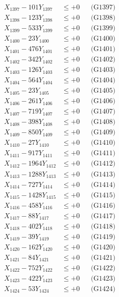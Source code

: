 \documentclass[a4paper,10pt]{article}
\begin{document}
{\begin{align}
X_{1397} - 101Y_{1397} &\leq +0 && \text{(G1397)} \\
X_{1398} - 123Y_{1398} &\leq +0 && \text{(G1398)} \\
X_{1399} - 533Y_{1399} &\leq +0 && \text{(G1399)} \\
X_{1400} - 23Y_{1400} &\leq +0 && \text{(G1400)} \\
\allowbreak
X_{1401} - 476Y_{1401} &\leq +0 && \text{(G1401)} \\
X_{1402} - 342Y_{1402} &\leq +0 && \text{(G1402)} \\
X_{1403} - 126Y_{1403} &\leq +0 && \text{(G1403)} \\
X_{1404} - 564Y_{1404} &\leq +0 && \text{(G1404)} \\
X_{1405} - 23Y_{1405} &\leq +0 && \text{(G1405)} \\
X_{1406} - 261Y_{1406} &\leq +0 && \text{(G1406)} \\
X_{1407} - 719Y_{1407} &\leq +0 && \text{(G1407)} \\
X_{1408} - 398Y_{1408} &\leq +0 && \text{(G1408)} \\
X_{1409} - 850Y_{1409} &\leq +0 && \text{(G1409)} \\
X_{1410} - 27Y_{1410} &\leq +0 && \text{(G1410)} \\
\allowbreak
X_{1411} - 917Y_{1411} &\leq +0 && \text{(G1411)} \\
X_{1412} - 1964Y_{1412} &\leq +0 && \text{(G1412)} \\
X_{1413} - 1288Y_{1413} &\leq +0 && \text{(G1413)} \\
X_{1414} - 727Y_{1414} &\leq +0 && \text{(G1414)} \\
X_{1415} - 1428Y_{1415} &\leq +0 && \text{(G1415)} \\
X_{1416} - 458Y_{1416} &\leq +0 && \text{(G1416)} \\
X_{1417} - 88Y_{1417} &\leq +0 && \text{(G1417)} \\
X_{1418} - 402Y_{1418} &\leq +0 && \text{(G1418)} \\
X_{1419} - 39Y_{1419} &\leq +0 && \text{(G1419)} \\
X_{1420} - 162Y_{1420} &\leq +0 && \text{(G1420)} \\
\allowbreak
X_{1421} - 84Y_{1421} &\leq +0 && \text{(G1421)} \\
X_{1422} - 752Y_{1422} &\leq +0 && \text{(G1422)} \\
X_{1423} - 422Y_{1423} &\leq +0 && \text{(G1423)} \\
X_{1424} - 53Y_{1424} &\leq +0 && \text{(G1424)} \\

\end{align}}
\end{document}
